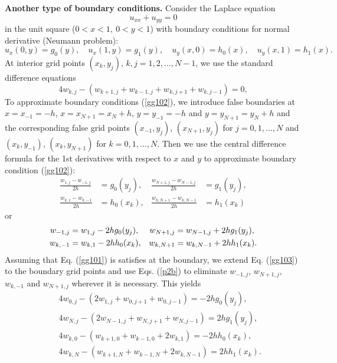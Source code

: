 {\bf Another type of boundary conditions.} Consider the Laplace equation
\begin{equation}
u_{xx}+u_{yy} =0    \label{gg101}
\end{equation}
in the unit square ($0<x<1, \ 0<y<1$) with boundary conditions for normal derivative
(Neumann problem):
\begin{equation}
u_{x}(0,y) =g_{0}(y), \quad u_{x}(1,y) =g_{1}(y), \quad u_{y}(x,0)=h_{0}(x), \quad
u_{y}(x,1) = h_{1}(x).    \label{gg102}
\end{equation}
At interior grid points $(x_{k},y_{j})$, $k,j=1,2,\dots,N-1$, we use the standard difference equations
\begin{equation}
4w_{k,j}-\left(w_{k+1,j}+w_{k-1,j}+w_{k,j+1}+w_{k,j-1}\right)
=0, \label{gg103}
\end{equation}
To approximate boundary conditions (\ref{gg102}),
we introduce false boundaries at $x=x_{-1}=-h$, $x=x_{N+1}=x_{N}+h$, $y=y_{-1}=-h$ and $y=y_{N+1}=y_{N}+h$
and the corresponding false grid points
$(x_{-1},y_{j})$, $(x_{N+1},y_{j})$ for $j=0,1,\dots,N$
and $(x_{k},y_{-1})$, $(x_{k},y_{N+1})$ for $k=0,1,\dots,N$.
Then we use the central difference formula for the 1st derivatives
with respect to $x$ and $y$ to approximate boundary condition (\ref{gg102}):
\begin{align*}
\frac{w_{1,j}-w_{-1,j}}{2h}&=g_{0}(y_j),  & \frac{w_{N+1,j}-w_{N-1,j}}{2h}&=g_{1}(y_j), \\
\frac{w_{k,1}-w_{k,-1}}{2h}&=h_{0}(x_k),  & \frac{w_{k,N+1}-w_{k,N-1}}{2h}&=h_{1}(x_k)
\end{align*}
or
\begin{align}
w_{-1,j}&=w_{1,j}-2h g_{0}(y_j), & w_{N+1,j}&=w_{N-1,j}+2h g_{1}(y_j), \notag\\
w_{k,-1}&=w_{k,1}-2h h_{0}(x_k), & w_{k,N+1}&=w_{k,N-1}+2h h_{1}(x_k). \label{p2b}
\end{align}
Assuming that Eq. (\ref{gg101}) is satisfies at the boundary, we extend Eq.  (\ref{gg103})
to the boundary grid points and use Eqs. (\ref{p2b})
to eliminate $w_{-1,j}$, $w_{N+1,j}$, $w_{k,-1}$ and $w_{N+1,j}$ wherever it is necessary. This yields
\begin{eqnarray}
&&4w_{0,j}-\left(2w_{1,j}+w_{0,j+1}+w_{0,j-1}\right)
=-2h g_{0}(y_j), \label{gg104} \\
&&4w_{N,j}-\left(2w_{N-1,j}+w_{N,j+1}+w_{N,j-1}\right)
=2h g_{1}(y_j), \label{gg105} \\
&&4w_{k,0}-\left(w_{k+1,0}+w_{k-1,0}+2w_{k,1}\right)
=-2h h_{0}(x_k), \label{gg106} \\
&&4w_{k,N}-\left(w_{k+1,N}+w_{k-1,N}+2w_{k,N-1}\right)
=2h h_{1}(x_k). \label{gg107}
\end{eqnarray}
